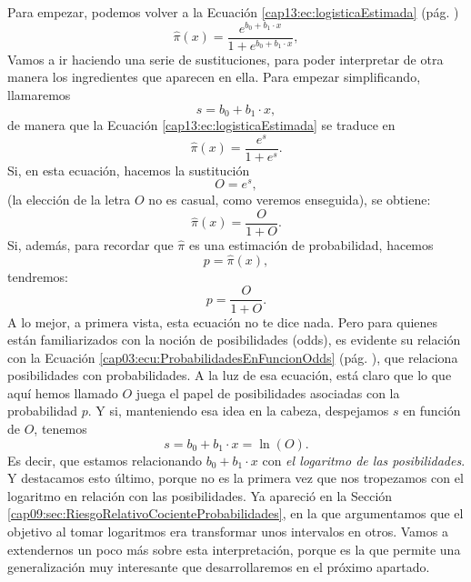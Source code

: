 Para empezar, podemos volver a la Ecuación \ref{cap13:ec:logisticaEstimada} (pág. \pageref{cap13:ec:logisticaEstimada})
    \[\hat\pi(x)=\dfrac{e^{b_0+b_1\cdot x}}{1+e^{b_0+b_1\cdot x}},\]
Vamos a ir haciendo una serie de sustituciones, para poder interpretar de otra manera los ingredientes que aparecen en ella. Para empezar simplificando, llamaremos
\[s = b_0 + b_1\cdot x,\]
de manera que la Ecuación \ref{cap13:ec:logisticaEstimada} se traduce en
\[\hat\pi(x)=\dfrac{e^{s}}{1+e^{s}}.\]
Si, en esta ecuación, hacemos la sustitución
    \[ O = e^s,\]
(la elección de la letra $O$ no es casual, como veremos enseguida), se obtiene:
    \begin{equation}
    \label{cap13:ecu:RelacionPiConOdds}
        \hat\pi(x)=\dfrac{O}{1+O}.
    \end{equation}
Si, además, para recordar que $\hat\pi$ es una estimación de probabilidad, hacemos
    \[p=\hat\pi(x),\]
tendremos:
    \[p=\dfrac{O}{1 + O}.\]
A lo mejor, a primera vista, esta ecuación no te dice nada. Pero para quienes están familiarizados con la noción de posibilidades (odds), es evidente su relación con la Ecuación \ref{cap03:ecu:ProbabilidadesEnFuncionOdds} (pág. \pageref{cap03:ecu:ProbabilidadesEnFuncionOdds}), que relaciona posibilidades con probabilidades. A la luz de esa ecuación, está claro que lo que aquí hemos llamado $O$ juega el papel de posibilidades asociadas con la probabilidad $p$.  Y si, manteniendo esa idea en la cabeza, despejamos $s$ en función de $O$, tenemos
\begin{equation}
\label{cap13:ecu:RelacionPiConOdds02}
s= b_0+b_1\cdot x = \ln(O).
\end{equation}
Es decir, que estamos relacionando $b_0+b_1\cdot x$ con {\em el logaritmo de las posibilidades}. Y destacamos esto último, porque no es la primera vez que nos tropezamos con el logaritmo en relación con las posibilidades. Ya apareció en la Sección \ref{cap09:sec:RiesgoRelativoCocienteProbabilidades}, en la que argumentamos que el objetivo al tomar logaritmos era transformar unos intervalos en otros. Vamos a extendernos un poco más sobre esta interpretación, porque es la que permite una generalización muy interesante que desarrollaremos en el próximo apartado.

